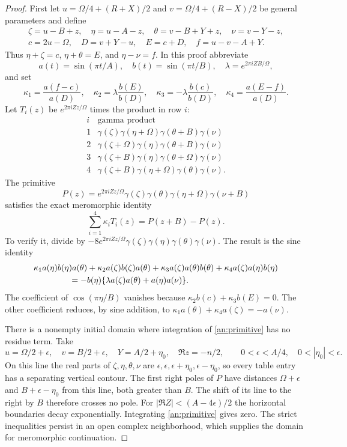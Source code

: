 \documentclass[11pt]{article}
\numberwithin{equation}{section}
\theoremstyle{definition}
\theoremstyle{remark}
\begin{document}
\begin{proof}
First let $u=\Omega/4+(R+X)/2$ and
$v=\Omega/4+(R-X)/2$ be general parameters and define
\begin{gather*}
 \zeta=u-B+z,\quad \eta=u-A-z,\quad
 \theta=v-B+Y+z,\quad \nu=v-Y-z,\\
 c=2u-\Omega,\quad D=v+Y-u,\quad E=c+D,\quad
 f=u-v-A+Y.
\end{gather*}
Thus $\eta+\zeta=c$, $\eta+\theta=E$, and $\eta-\nu=f$.
In this proof abbreviate
\[
 a(t)=\sin(\pi t/A),\quad b(t)=\sin(\pi t/B),\quad
 \lambda=e^{2\pi iZB/\Omega},
\]
and set
\[
 \kappa_1=\frac{a(f-c)}{a(D)},\quad
 \kappa_2=\lambda\frac{b(E)}{b(D)},\quad
 \kappa_3=-\lambda\frac{b(c)}{b(D)},\quad
 \kappa_4=\frac{a(E-f)}{a(D)}.
\]
Let $T_i(z)$ be $e^{2\pi iZz/\Omega}$ times the product in row $i$:
\[
\begin{array}{c|l}
 i&\text{gamma product}\\\hline
 1&\gamma(\zeta)\gamma(\eta+\Omega)\gamma(\theta+B)\gamma(\nu)\\
 2&\gamma(\zeta+\Omega)\gamma(\eta)\gamma(\theta+B)\gamma(\nu)\\
 3&\gamma(\zeta+B)\gamma(\eta)\gamma(\theta+\Omega)\gamma(\nu)\\
 4&\gamma(\zeta+B)\gamma(\eta+\Omega)\gamma(\theta)\gamma(\nu).
\end{array}
\]
The primitive
\[
 P(z)=e^{2\pi iZz/\Omega}
       \gamma(\zeta)\gamma(\theta)\gamma(\eta+\Omega)\gamma(\nu+B)
\]
satisfies the exact meromorphic identity
\begin{equation}
 \sum_{i=1}^4\kappa_iT_i(z)=P(z+B)-P(z).
 \label{an:primitive}
\end{equation}
To verify it, divide by
$-8e^{2\pi iZz/\Omega}\gamma(\zeta)\gamma(\eta)
\gamma(\theta)\gamma(\nu)$.  The result is the sine identity
\begin{align*}
 &\kappa_1a(\eta)b(\eta)a(\theta)
 +\kappa_2a(\zeta)b(\zeta)a(\theta)
 +\kappa_3a(\zeta)a(\theta)b(\theta)
 +\kappa_4a(\zeta)a(\eta)b(\eta)\\
 &\hspace{15mm}=-b(\eta)
             \{\lambda a(\zeta)a(\theta)+a(\eta)a(\nu)\}.
\end{align*}
The coefficient of $\cos(\pi\eta/B)$ vanishes because
$\kappa_2b(c)+\kappa_3b(E)=0$.  The other coefficient reduces,
by sine addition, to
$\kappa_1a(\theta)+\kappa_4a(\zeta)=-a(\nu)$.

There is a nonempty initial domain where integration of
\eqref{an:primitive} has no residue term.  Take
\[
 u=\Omega/2+\epsilon,\quad v=B/2+\epsilon,\quad
 Y=A/2+\eta_0,\quad \Re z=-n/2,\qquad
 0<\epsilon<A/4,\quad0<|\eta_0|<\epsilon.
\]
On this line the real parts of $\zeta,\eta,\theta,\nu$ are
$\epsilon,\epsilon,\epsilon+\eta_0,\epsilon-\eta_0$, so
every table entry has a separating vertical contour.  The first
right poles of $P$ have distances $\Omega+\epsilon$ and
$B+\epsilon-\eta_0$ from this line, both greater than $B$.
The shift of its line to the right by $B$ therefore crosses no pole.
For $|\Re Z|<(A-4\epsilon)/2$ the horizontal boundaries decay
exponentially.  Integrating \eqref{an:primitive} gives zero.
The strict inequalities persist in an open complex neighborhood,
which supplies the domain for meromorphic continuation.


\end{proof}
\end{document}
